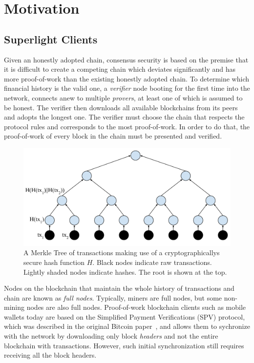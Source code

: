 \section{Motivation}
\subsection{Superlight Clients}

Given an honestly adopted chain, consensus security is based on the premise that
it is difficult to create a competing chain which deviates significantly and has
more proof-of-work than the existing honestly adopted chain. To determine which
financial history is the valid one, a \emph{verifier} node booting for the first
time into the network, connects anew to multiple \emph{provers}, at least one of
which is assumed to be honest. The verifier then downloads all available
blockchains from its peers and adopts the longest one. The verifier must choose
the chain that respects the protocol rules and corresponds to the most
proof-of-work. In order to do that, the proof-of-work of every block in the
chain must be presented and verified.

\begin{figure}[tb]%
  \centering
  \includegraphics[width=0.9 \textwidth]{chapters/introduction/figures/merkle-tree.pdf}
  \caption{
    A Merkle Tree of transactions making use of a cryptographicallys secure hash
    function $H$. Black nodes indicate raw transactions.
    Lightly shaded nodes indicate hashes. The root is shown at the top.
  }
  \label{fig.merkle}
\end{figure}%

Nodes on the blockchain that maintain the whole history of transactions and
chain are known as \emph{full nodes}. Typically, miners are full nodes, but some
non-mining nodes are also full nodes.
Proof-of-work blockchain clients such as mobile wallets today are based on the
Simplified Payment Verifications (SPV) protocol, which was described in the
original Bitcoin paper~\cite{bitcoin}, and allows them to sychronize with the
network by downloading only block \emph{headers} and not the entire blockchain with
transactions. However, such initial synchronization still requires receiving all
the block headers.

